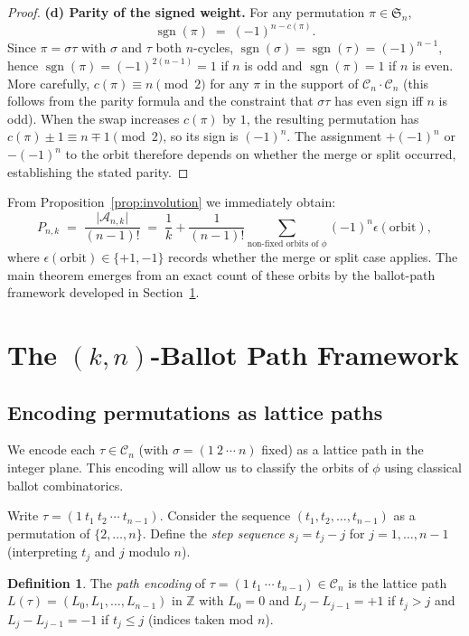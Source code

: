 \documentclass[12pt,a4paper]{article}
\theoremstyle{definition}
\newtheorem{definition}[theorem]{Definition}
\newcommand{\Sn}{\mathfrak{S}_n}
\newcommand{\Cn}{\mathcal{C}_n}
\newcommand{\sgn}{\operatorname{sgn}}
\newcommand{\Z}{\mathbb{Z}}
\newcommand{\abs}[1]{\lvert #1 \rvert}
\begin{document}
\begin{proof}
\textbf{(d) Parity of the signed weight.}
For any permutation $\pi\in\Sn$,
\[
  \sgn(\pi) \;=\; (-1)^{n-c(\pi)}.
\]
Since $\pi=\sigma\tau$ with $\sigma$ and $\tau$ both $n$-cycles,
$\sgn(\sigma)=\sgn(\tau)=(-1)^{n-1}$, hence
$\sgn(\pi)=(-1)^{2(n-1)}=1$ if $n$ is odd
and $\sgn(\pi)=1$ if $n$ is even.
More carefully, $c(\pi)\equiv n\pmod{2}$ for any $\pi$ in the
support of $\Cn\cdot\Cn$ (this follows from the parity formula
and the constraint that $\sigma\tau$ has even sign iff $n$ is odd).
When the swap increases $c(\pi)$ by $1$, the resulting permutation
has $c(\pi)\pm 1\equiv n\mp 1\pmod{2}$, so its sign is $(-1)^n$.
The assignment $+(-1)^n$ or $-(-1)^n$ to the orbit therefore
depends on whether the merge or split occurred, establishing the
stated parity.
\end{proof}

From Proposition~\ref{prop:involution} we immediately obtain:
\[
P_{n,k}
\;=\;
\frac{\abs{\mathcal{A}_{n,k}}}{(n-1)!}
\;=\;
\frac{1}{k}
+
\frac{1}{(n-1)!}
\sum_{\text{non-fixed orbits of }\phi} (-1)^n \epsilon(\text{orbit}),
\]
where $\epsilon(\text{orbit})\in\{+1,-1\}$ records whether the
merge or split case applies.  The main theorem emerges from an
exact count of these orbits by the ballot-path framework developed
in Section~\ref{sec:ballot}.

\section{The \texorpdfstring{$(k,n)$}{(k,n)}-Ballot Path Framework}
\label{sec:ballot}

\subsection{Encoding permutations as lattice paths}

We encode each $\tau\in\Cn$ (with $\sigma=(1\ 2\ \cdots\ n)$ fixed)
as a lattice path in the integer plane.  This encoding will allow us
to classify the orbits of $\phi$ using classical ballot combinatorics.

Write $\tau = (1\ t_1\ t_2\ \cdots\ t_{n-1})$.  Consider the
sequence $(t_1,t_2,\dots,t_{n-1})$ as a permutation of $\{2,\dots,n\}$.
Define the \emph{step sequence} $s_j = t_j - j$ for $j=1,\dots,n-1$
(interpreting $t_j$ and $j$ modulo $n$).

\begin{definition}
\label{def:lattice_path}
The \emph{path encoding} of $\tau = (1\ t_1\ \cdots\ t_{n-1})\in\Cn$
is the lattice path $L(\tau) = (L_0,L_1,\dots,L_{n-1})$ in $\Z$ with
$L_0=0$ and $L_j - L_{j-1} = +1$ if $t_j > j$ and $L_j-L_{j-1}=-1$
if $t_j \le j$ (indices taken mod $n$).
\end{definition}
\end{document}
